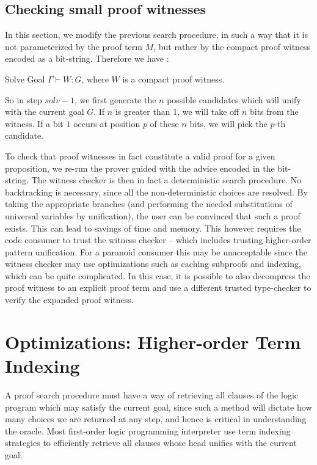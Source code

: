 \documentclass{acmconf}
\newcommand{\vd}{\vdash}
\begin{document}
\subsection{Checking small proof witnesses}
In this section, we modify the previous search procedure, in such a
way that it is not parameterized by the proof term $M$, but rather by
the compact proof witness encoded as a bit-string. Therefore we have :

\begin{center}
Solve Goal $\Gamma \vd W : G$, where $W$ is a compact proof witness.  
\end{center}

So in step $solv-1$, we first generate the $n$ possible candidates which
will unify with the current goal $G$. If $n$ is greater than 1, we
will take off $n$ bits from the witness. If a bit $1$ occurs at
position $p$ of these $n$ bits, we will pick the $p$-th candidate.

To check that proof witnesses in fact constitute a valid proof for a
given proposition, we re-run the prover guided with the advice encoded
in the bit-string. The witness checker is then in fact a deterministic
search procedure. No backtracking is necessary, since all the
non-deterministic choices are resolved.  By taking the appropriate
branches (and performing the needed substitutions of universal
variables by unification), the user can be convinced that such a
proof exists. This can lead to savings of time and memory.
This however requires the code consumer to trust the witness
checker -- which includes trusting higher-order pattern
unification. For a paranoid consumer this may be unacceptable since
the witness checker may use optimizations such as caching subproofs
and indexing, which can be quite complicated. In this case, it is
possible to also decompress the proof witness to an explicit proof
term and use a different trusted type-checker to verify the expanded
proof witness. 

\section{Optimizations: Higher-order Term Indexing}

A proof search procedure must have a way of retrieving all clauses of
the logic program which may satisfy the current goal, since such a
method will dictate how many choices we are returned at any step, and
hence is critical in understanding the oracle. Most first-order logic
programming interpreter use term indexing strategies to efficiently
retrieve all clauses whose head unifies with the current goal.
\end{document}
